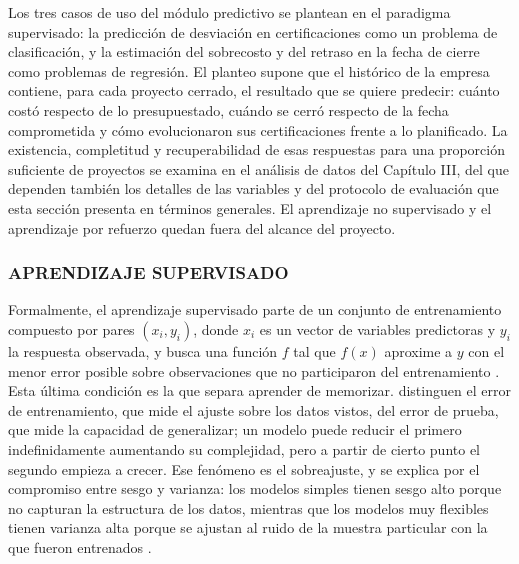 Los tres casos de uso del módulo predictivo se plantean en el paradigma supervisado: la predicción de desviación en certificaciones como un problema de clasificación, y la estimación del sobrecosto y del retraso en la fecha de cierre como problemas de regresión. El planteo supone que el histórico de la empresa contiene, para cada proyecto cerrado, el resultado que se quiere predecir: cuánto costó respecto de lo presupuestado, cuándo se cerró respecto de la fecha comprometida y cómo evolucionaron sus certificaciones frente a lo planificado. La existencia, completitud y recuperabilidad de esas respuestas para una proporción suficiente de proyectos se examina en el análisis de datos del Capítulo III, del que dependen también los detalles de las variables y del protocolo de evaluación que esta sección presenta en términos generales. El aprendizaje no supervisado y el aprendizaje por refuerzo quedan fuera del alcance del proyecto.

\subsubsection{APRENDIZAJE SUPERVISADO}

Formalmente, el aprendizaje supervisado parte de un conjunto de entrenamiento compuesto por pares $(x_i, y_i)$, donde $x_i$ es un vector de variables predictoras y $y_i$ la respuesta observada, y busca una función $f$ tal que $f(x)$ aproxime a $y$ con el menor error posible sobre observaciones que no participaron del entrenamiento \parencite{Hastie2009}. Esta última condición es la que separa aprender de memorizar. \textcite{James2021} distinguen el error de entrenamiento, que mide el ajuste sobre los datos vistos, del error de prueba, que mide la capacidad de generalizar; un modelo puede reducir el primero indefinidamente aumentando su complejidad, pero a partir de cierto punto el segundo empieza a crecer. Ese fenómeno es el sobreajuste, y se explica por el compromiso entre sesgo y varianza: los modelos simples tienen sesgo alto porque no capturan la estructura de los datos, mientras que los modelos muy flexibles tienen varianza alta porque se ajustan al ruido de la muestra particular con la que fueron entrenados \parencite{Hastie2009, James2021}.

